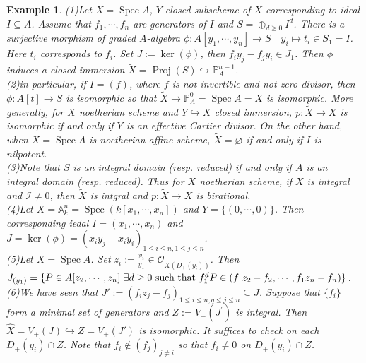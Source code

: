 \documentclass{ctexart}
\newtheorem{example}{Example}[section]
\newcommand{\spec}{\operatorname{Spec}}
\newcommand{\proj}{\operatorname{Proj}}
\begin{document}
\begin{example}
    (1)Let $X = \spec A$, $Y$ closed subscheme of $X$ corresponding to ideal $I \subseteq A$.
    Assume that $f_{1}, \cdots, f_{n}$ are generators of $I$ and $S = \oplus_{d \ge 0} I^{d}$.
    There is a surjective morphism of graded $A$-algebra $\phi: A[y_{1}, \cdots, y_{n}] \longrightarrow S\quad y_{i} \longmapsto t_{i}\in S_{1} = I$.
    Here $t_{i}$ corresponds to $f_{i}$.
    Set $J := \ker(\phi)$, then $f_{i}y_{j} - f_{j}y_{i}\in J_{1}$.
    Then $\phi$ induces a closed immersion $\widetilde{X} = \proj(S) \hookrightarrow \mathbb{P}_{A}^{n - 1}$.
    \\
    (2)in particular, if $I = (f)$, where $f$ is not invertible and not zero-divisor, then $\phi: A[t] \longrightarrow S$ is isomorphic so that $\widetilde{X} \longrightarrow \mathbb{P}_{A}^{0} = \spec A = X$ is isomorphic.
    More generally, for $X$ noetherian scheme and $Y \hookrightarrow X$ closed immersion, $p: \widetilde{X} \longrightarrow X$ is isomorphic if and only if $Y$ is an effective Cartier divisor.
    On the other hand, when $X = \spec A$ is noetherian affine scheme, $\widetilde{X} = \varnothing$ if and only if $I$ is nilpotent.
    \\
    (3)Note that $S$ is an integral domain (resp. reduced) if and only if $A$ is an integral domain (resp. reduced).
    Thus for $X$ noetherian scheme, if $X$ is integral and $\mathcal{I} \neq 0$, then $\widetilde{X}$ is intgral and $p: \widetilde{X} \longrightarrow X$ is birational.
    \\
    (4)Let $X = \mathbb{A}_{k}^{n} = \spec(k[x_{1}, \cdots, x_{n}])$ and $Y = \{(0, \cdots, 0)\}$.
    Then corresponding iedal $I = (x_{1}, \cdots, x_{n})$ and $J = \ker(\phi) = (x_{i}y_{j} - x_{i}y_{i})_{1 \le i \le n, 1 \le j \le n}$.
    \\
    (5)Let $X = \spec A$.
    Set $z_{i} := \frac{y_{i}}{y_{1}}\in \mathcal{O}_{\widetilde{X}(D_{+}(y_{i}))}$.
    Then $J_{(y_{1})} = \{P\in A[z_{2}, \cdots, z_{n}] \big{|} \exists d \ge 0 \text{ such that } f_{1}^{d}P\in (f_{1}z_{2} - f_{2}, \cdots, f_{1}z_{n} - f_{n})\}$.
    \\
    (6)We have seen that $J' := (f_{i}z_{j} - f_{j})_{1 \le i \le n, q \le j \le n} \subseteq J$.
    Suppose that $\{f_{i}\}$ form a minimal set of generators and $Z := V_{+}(J^{'})$ is integral.
    Then $\widehat{X} = V_{+}(J) \hookrightarrow Z = V_{+}(J')$ is isomorphic.
    It suffices to check on each $D_{+}(y_{i}) \cap Z$.
    Note that $f_{i}\notin (f_{j})_{j \neq i}$ so that $f_{i} \neq 0$ on $D_{+}(y_{i}) \cap Z$.

\end{example}
\end{document}
